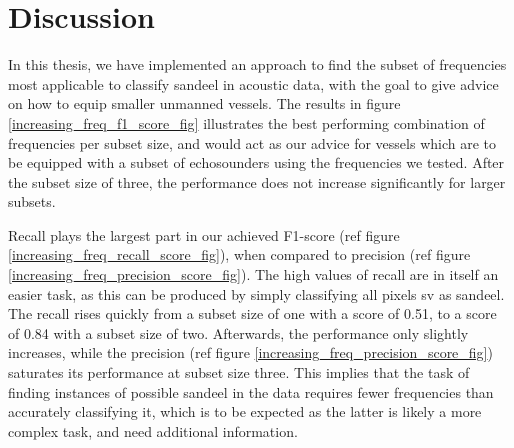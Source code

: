 \chapter{Discussion}
    In this thesis, we have implemented an approach to find the subset of frequencies most applicable to classify sandeel in acoustic data, with the goal to give advice on how to equip smaller unmanned vessels. The results in figure  \ref{increasing_freq_f1_score_fig} illustrates the best performing combination of frequencies per subset size, and would act as our advice for vessels which are to be equipped with a subset of echosounders using the frequencies we tested. After the subset size of three, the performance does not increase significantly for larger subsets. 
    
    
    
    
    Recall plays the largest part in our achieved F1-score (ref figure \ref{increasing_freq_recall_score_fig}), when compared to precision (ref figure \ref{increasing_freq_precision_score_fig}). The high values of recall are in itself an easier task, as this can be produced by simply classifying all pixels \gls{sv} as sandeel. The recall rises quickly from a subset size of one with a score of 0.51, to a score of 0.84 with a subset size of two. Afterwards, the performance  only slightly increases, while the precision (ref figure \ref{increasing_freq_precision_score_fig}) saturates its performance at subset size three. This implies that the task of finding instances of possible sandeel in the data requires fewer frequencies than accurately classifying it, which is to be expected as the latter is likely a more complex task, and need additional information. 
    
